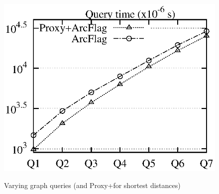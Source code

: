 \begin{figure}[t!]
\begin{center}
{\includegraphics[scale=0.422]{./exp/query_cus_dist_af.eps}}
\end{center}
\vspace{-0.5ex}
\caption{Varying graph queries (\arcflag and Proxy+\arcflag for shortest distances)}
\label{fig:performance_dist_queries_af}
\vspace{-1ex}
\end{figure}
